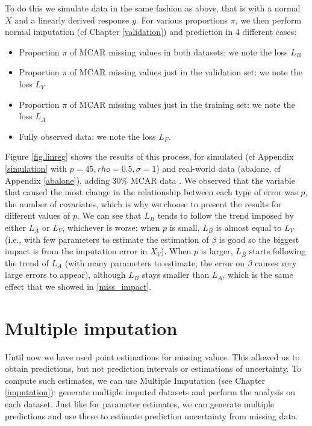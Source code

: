 To do this we simulate data in the same fashion as above, that is with a normal $X$ and a linearly derived response $y$. For various proportions $\pi$, we then perform normal imputation (cf Chapter \ref{validation}) and prediction in 4 different cases:
\begin{itemize}
\item Proportion $\pi$ of MCAR missing values in both datasets: we note the loss $L_B$
\item Proportion $\pi$ of MCAR missing values just in the validation set: we note the loss $L_V$
\item Proportion $\pi$ of MCAR missing values just in the training set: we note the loss $L_A$
\item Fully observed data: we note the loss $L_F$.
\end{itemize}

Figure \ref{fig.linreg} shows the results of this process, for simulated (cf Appendix \ref{simulation} with $p=45, rho=0.5, \sigma=1$) and real-world data (abalone, cf Appendix \ref{abalone}), adding 30\% MCAR data . We observed that the variable that caused the most change in the relationship between each type of error was $p$, the number of covariates, which is why we choose to present the results for different values of $p$. We can see that $L_B$ tends to follow the trend imposed by either $L_A$ or $L_V$, whichever is worse: when $p$ is small, $L_B$ is almost equal to $L_V$ (i.e., with few parameters to estimate the estimation of $\beta$ is good so the biggest impact is from the imputation error in $X_V$). When $p$ is larger, $L_B$ starts following the trend of $L_A$ (with many parameters to estimate, the error on $\beta$ causes very large errors to appear), although $L_B$ stays smaller than $L_A$, which is the same effect that we showed in \ref{miss_impact}.



\section{Multiple imputation}

Until now we have used point estimations for missing values. This allowed us to obtain predictions, but not prediction intervals or estimations of uncertainty. To compute such estimates, we can use Multiple Imputation (see Chapter \ref{imputation}): generate multiple imputed datasets and perform the analysis on each dataset. Just like for parameter estimates, we can generate multiple predictions and use these to estimate prediction uncertainty from missing data.

